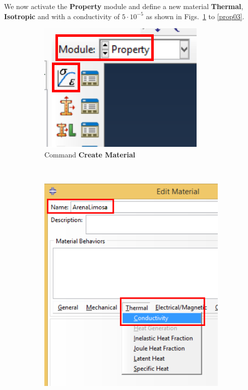 We now activate the \textbf{Property} module and define a new material
\textbf{Thermal}, \textbf{Isotropic} and with a conductivity of
$5\cdot 10^{-5}$ as shown in Figs.~\ref{prop01} to \ref{prop03}.
\begin{figure}[!h]
  \centering
  \begin{subfigure}[!h]{0.22\textwidth}
    \includegraphics[width=\textwidth]{./body/images/prop01.pdf}
    \caption{Command \textbf{Create Material}}
    \label{prop01}
  \end{subfigure}%
  ~ %
  \begin{subfigure}[!h]{0.36\textwidth}
    \includegraphics[width=\textwidth]{./body/images/prop02.pdf}

\end{subfigure}
\end{figure}
